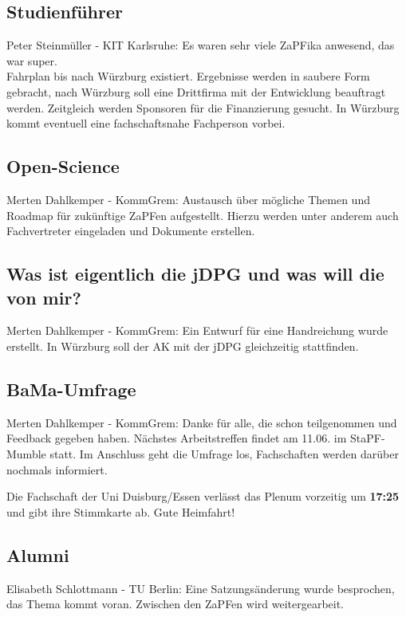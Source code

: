 \tocless  \subsection{Studienführer}
    Peter Steinmüller - KIT Karlsruhe:  Es waren sehr viele ZaPFika anwesend, das war super. \\
    Fahrplan bis nach Würzburg existiert.
    Ergebnisse werden in saubere Form gebracht, nach Würzburg soll eine Drittfirma mit der Entwicklung beauftragt werden.
    Zeitgleich werden Sponsoren für die Finanzierung gesucht.
    In Würzburg kommt eventuell eine fachschaftsnahe Fachperson vorbei.

\tocless  \subsection{Open-Science}
    Merten Dahlkemper - KommGrem:  Austausch über mögliche Themen und Roadmap für zukünftige ZaPFen aufgestellt. Hierzu werden unter anderem auch Fachvertreter eingeladen und Dokumente erstellen.

\tocless  \subsection{Was ist eigentlich die jDPG und was will die von mir?}
    Merten Dahlkemper - KommGrem:  Ein Entwurf für eine Handreichung wurde erstellt. In Würzburg soll der AK mit der jDPG gleichzeitig stattfinden.

\tocless  \subsection{BaMa-Umfrage}
    Merten Dahlkemper - KommGrem:  Danke für alle, die schon teilgenommen und Feedback gegeben haben.
    Nächstes Arbeitstreffen findet am 11.06. im StaPF-Mumble statt.
    Im Anschluss geht die Umfrage los, Fachschaften werden darüber nochmals informiert.

  \begin{info}{}
    Die Fachschaft der Uni Duisburg/Essen verlässt das Plenum vorzeitig um \textbf{17:25} und gibt ihre Stimmkarte ab. Gute Heimfahrt!
  \end{info}

\tocless  \subsection{Alumni}
    Elisabeth Schlottmann - TU Berlin:  Eine Satzungsänderung wurde besprochen, das Thema kommt voran. Zwischen den ZaPFen wird weitergearbeit.

